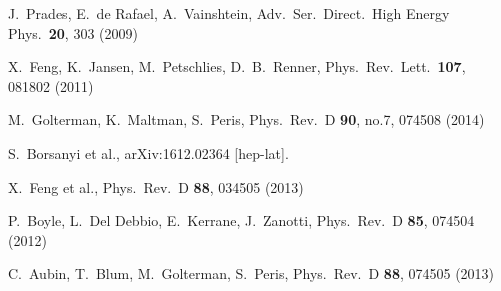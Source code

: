 \documentclass[epj,onecolumn]{webofc}
\begin{document}
\begin{thebibliography}{}
  J.~Prades, E.~de Rafael, A.~Vainshtein,
  Adv.\ Ser.\ Direct.\ High Energy Phys.\  {\bf 20}, 303 (2009)

  X.~Feng, K.~Jansen, M.~Petschlies, D.~B.~Renner,
  Phys.\ Rev.\ Lett.\  {\bf 107}, 081802 (2011)

  M.~Golterman, K.~Maltman, S.~Peris,
  Phys.\ Rev.\ D {\bf 90}, no.7,  074508 (2014)
%

  S.~Borsanyi et al.,
  arXiv:1612.02364 [hep-lat].

  X.~Feng et al.,
  Phys.\ Rev.\ D {\bf 88}, 034505 (2013)

  P.~Boyle, L.~Del Debbio, E.~Kerrane, J.~Zanotti,
  Phys.\ Rev.\ D {\bf 85}, 074504 (2012)

  C.~Aubin, T.~Blum, M.~Golterman, S.~Peris,
  Phys.\ Rev.\ D {\bf 88},  074505 (2013)


\end{thebibliography}
\end{document}
